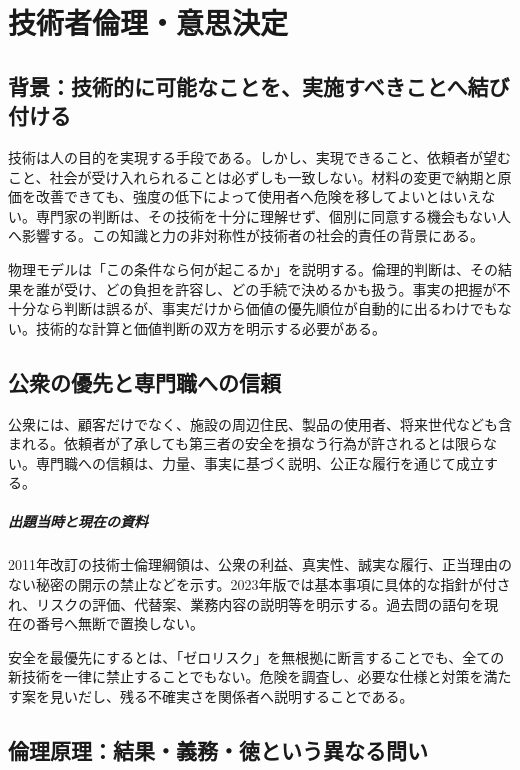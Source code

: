 \chapter{技術者倫理・意思決定}

\section{背景：技術的に可能なことを、実施すべきことへ結び付ける}
技術は人の目的を実現する手段である。しかし、実現できること、依頼者が望むこと、社会が受け入れられることは必ずしも一致しない。材料の変更で納期と原価を改善できても、強度の低下によって使用者へ危険を移してよいとはいえない。専門家の判断は、その技術を十分に理解せず、個別に同意する機会もない人へ影響する。この知識と力の非対称性が技術者の社会的責任の背景にある。

物理モデルは「この条件なら何が起こるか」を説明する。倫理的判断は、その結果を誰が受け、どの負担を許容し、どの手続で決めるかも扱う。事実の把握が不十分なら判断は誤るが、事実だけから価値の優先順位が自動的に出るわけでもない。技術的な計算と価値判断の双方を明示する必要がある。

\section{公衆の優先と専門職への信頼}
\label{theory:ethics:public}
公衆には、顧客だけでなく、施設の周辺住民、製品の使用者、将来世代なども含まれる。依頼者が了承しても第三者の安全を損なう行為が許されるとは限らない。専門職への信頼は、力量、事実に基づく説明、公正な履行を通じて成立する。

\paragraph{出題当時と現在の資料}
2011年改訂の技術士倫理綱領は、公衆の利益、真実性、誠実な履行、正当理由のない秘密の開示の禁止などを示す\parencite{ipej_ethics2011}。2023年版では基本事項に具体的な指針が付され、リスクの評価、代替案、業務内容の説明等を明示する\parencite{ipej_ethics2023}。過去問の語句を現在の番号へ無断で置換しない。

安全を最優先にするとは、「ゼロリスク」を無根拠に断言することでも、全ての新技術を一律に禁止することでもない。危険を調査し、必要な仕様と対策を満たす案を見いだし、残る不確実さを関係者へ説明することである。

\section{倫理原理：結果・義務・徳という異なる問い}
\label{theory:ethics:principles}
